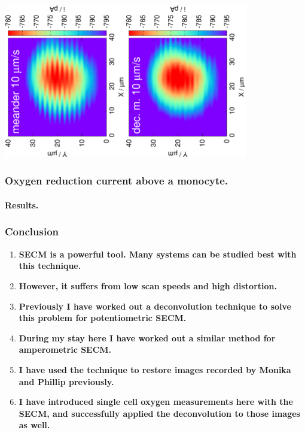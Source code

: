 \documentclass{beamer}
\begin{document}
\begin{frame}
        \centering
        \includegraphics[trim = 10mm 20mm 0mm 20mm, clip, width=0.4\textwidth, angle=-90]{9_41.eps}\includegraphics[trim = 10mm 20mm 0mm 20mm, clip, width=0.4\textwidth, angle=-90]{9_41_meandered_deconvoluted.eps}


\frametitle{Oxygen reduction current above a monocyte.}
        \framesubtitle{Results.}
\vfill
\end{frame}




\begin{frame}
\frametitle{Conclusion}
\begin{enumerate}
\item \textbf{SECM is a powerful tool. Many systems can be studied best with this technique.}
\item \textbf{However, it suffers from low scan speeds and high distortion.}
\item \textbf{Previously I have worked out a deconvolution technique to solve this problem for potentiometric SECM.}
\item \textbf{During my stay here I have worked out a similar method for amperometric SECM.}
\item \textbf{I have used the technique to restore images recorded by Monika and Phillip previously.}
\item \textbf{I have introduced single cell oxygen measurements here with the SECM, and successfully applied the deconvolution to those images as well.}

\end{enumerate}
\end{frame}
\end{document}
